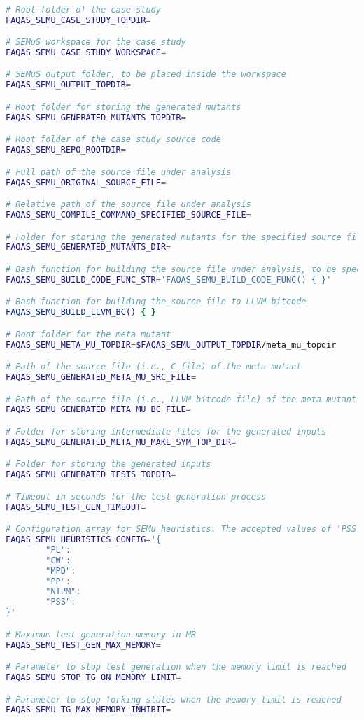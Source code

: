 \begin{lstlisting}[language=bash,label=listing:SEMUS:conf,caption=faqas\_semus\_conf.sh file.]

# Root folder of the case study
FAQAS_SEMU_CASE_STUDY_TOPDIR=

# SEMuS workspace for the case study
FAQAS_SEMU_CASE_STUDY_WORKSPACE=

# SEMuS output folder, to be placed inside the workspace
FAQAS_SEMU_OUTPUT_TOPDIR=

# Root folder for storing the generated mutants
FAQAS_SEMU_GENERATED_MUTANTS_TOPDIR=

# Root folder of the case study source code
FAQAS_SEMU_REPO_ROOTDIR=

# Full path of the source file under analysis
FAQAS_SEMU_ORIGINAL_SOURCE_FILE=

# Relative path of the source file under analysis
FAQAS_SEMU_COMPILE_COMMAND_SPECIFIED_SOURCE_FILE=

# Folder for storing the generated mutants for the specified source file
FAQAS_SEMU_GENERATED_MUTANTS_DIR=

# Bash function for building the source file under analysis, to be specified in string format
FAQAS_SEMU_BUILD_CODE_FUNC_STR='FAQAS_SEMU_BUILD_CODE_FUNC() { }'

# Bash function for building the source file to LLVM bitcode
FAQAS_SEMU_BUILD_LLVM_BC() { }

# Root folder for the meta mutant
FAQAS_SEMU_META_MU_TOPDIR=$FAQAS_SEMU_OUTPUT_TOPDIR/meta_mu_topdir

# Path of the source file (i.e., C file) of the meta mutant
FAQAS_SEMU_GENERATED_META_MU_SRC_FILE=

# Path of the source file (i.e., LLVM bitcode file) of the meta mutant
FAQAS_SEMU_GENERATED_META_MU_BC_FILE=

# Folder for storing intermediate files for the generated inputs
FAQAS_SEMU_GENERATED_META_MU_MAKE_SYM_TOP_DIR=

# Folder for storing the generated inputs
FAQAS_SEMU_GENERATED_TESTS_TOPDIR=

# Timeout in seconds for the test generation process
FAQAS_SEMU_TEST_GEN_TIMEOUT=

# Configuration array for SEMu heuristics. The accepted values of 'PSS' are 'RND' for random and 'MDO' for minimum distance to output
FAQAS_SEMU_HEURISTICS_CONFIG='{
        "PL":
        "CW":
        "MPD":
        "PP":
        "NTPM":
        "PSS":
}'

# Maximum test generation memory in MB
FAQAS_SEMU_TEST_GEN_MAX_MEMORY=

# Parameter to stop test generation when the memory limit is reached
FAQAS_SEMU_STOP_TG_ON_MEMORY_LIMIT=

# Parameter to stop forking states when the memory limit is reached
FAQAS_SEMU_TG_MAX_MEMORY_INHIBIT=

\end{lstlisting}

